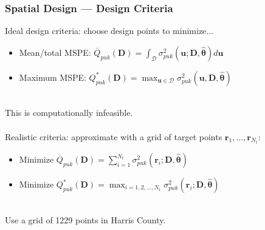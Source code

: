 \documentclass[xcolor=dvipsnames]{beamer}
\begin{document}
\begin{frame}
\frametitle{Spatial Design --- Design Criteria}
Ideal design criteria: choose design points to minimize...
\begin{itemize}
\item Mean/total MSPE: $\overline{Q}_{puk}(\bm{D}) = \int_{\mathcal{D}}\sigma_{puk}^2(\bm{u};\bm{D},\widehat{\bm{\theta}})d\bm{u}$
\item Maximum MSPE: $Q^*_{puk}(\bm{D}) = \max_{\bm{u}\in\mathcal{D}}\sigma_{puk}^2(\bm{u},\bm{D},\widehat{\bm{\theta}})$\\~\\
\end{itemize}

\pause

This is computationally infeasible. \\~\\

Realistic criteria: approximate with a grid of target points $\bm{r}_1,\dots,\bm{r}_{N_t}$:
\begin{itemize}
\item Minimize $\overline{Q}_{puk}(\bm{D}) = \sum_{i=1}^{N_t}\sigma_{puk}^2(\bm{r}_i;\bm{D},\widehat{\bm{\theta}})$
\item Minimize $Q_{puk}^*(\bm{D}) = \max_{i=1,2,\dots,N_t}\sigma_{puk}^2(\bm{r}_i;\bm{D},\widehat{\bm{\theta}})$\\~\\\pause
\end{itemize}
Use a grid of 1229 points in Harris County.
\end{frame}
\end{document}
